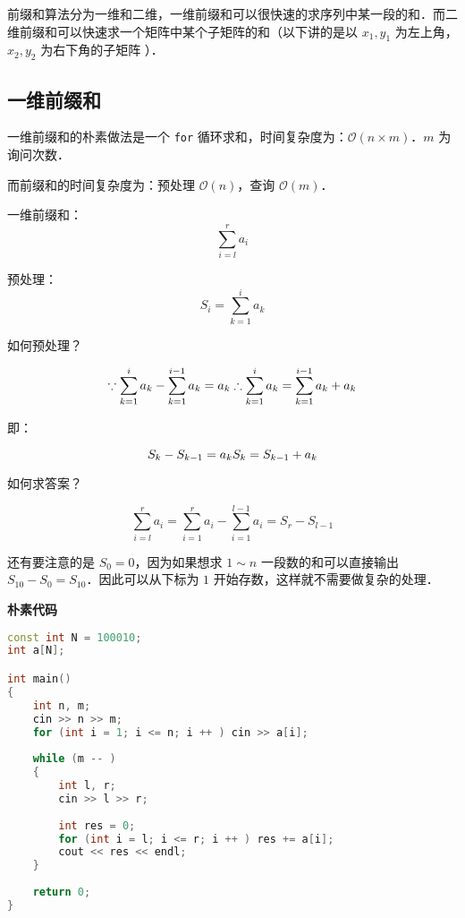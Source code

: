 
前缀和算法分为一维和二维，一维前缀和可以很快速的求序列中某一段的和．而二维前缀和可以快速求一个矩阵中某个子矩阵的和（以下讲的是以 $x_1, y_1$ 为左上角，$x_2, y_2$ 为右下角的子矩阵 ）．

\subsection{一维前缀和}
一维前缀和的朴素做法是一个 \verb|for| 循环求和，时间复杂度为：$\mathcal{O}(n \times m)$．$m$ 为询问次数．

而前缀和的时间复杂度为：预处理 $\mathcal{O}(n)$，查询 $\mathcal{O}(m)$．

一维前缀和：
\begin{equation}
\sum^{r}_{i=l}a_i
\end{equation}

预处理：
\begin{equation}
S_i=\sum^{i}_{k=1}a_k
\end{equation}

如何预处理？

\begin{equation}
\because 
\sum^{i}_{k=1}a_k-\sum^{i-1}_{k=1}a_{k}=a_k \\
 \therefore \sum^{i}_{k=1}a_k=\sum^{i-1}_{k=1}a_{k}+a_k \\
\end{equation}

即：

\begin{equation}
\\S_k-S_{k-1}=a_k\\
 \\S_k=S_{k-1}+a_k\\
\end{equation}

如何求答案？

\begin{equation}
\sum^{r}_{i=l}a_i=\sum^{r}_{i=1}a_i-\sum^{l-1}_{i=1}a_i=S_r-S_{l-1}
\end{equation}

还有要注意的是 $S_0 = 0$，因为如果想求 $1 \sim n$ 一段数的和可以直接输出 $S_{10} - S_0 = S_{10} $．因此可以从下标为 $1$ 开始存数，这样就不需要做复杂的处理．

\textbf{朴素代码}
\begin{lstlisting}[language=cpp]
const int N = 100010;
int a[N];

int main()
{
    int n, m;
    cin >> n >> m;
    for (int i = 1; i <= n; i ++ ) cin >> a[i];
    
    while (m -- )
    {
        int l, r;
        cin >> l >> r;
        
        int res = 0;
        for (int i = l; i <= r; i ++ ) res += a[i];
        cout << res << endl;
    }
    
    return 0;
}
\end{lstlisting}

